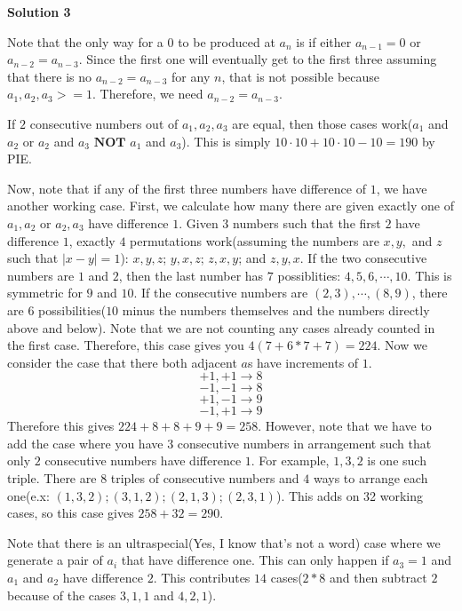 \begin{enumerate}
 



\textbf{Solution 3}

Note that the only way for a $0$ to be produced at $a_n$ is if either $a_{n-1} = 0$ or $a_{n-2} = a_{n-3}$. Since the first one will eventually get to the first three assuming that there is no $a_{n-2} = a_{n-3}$ for any $n$, that is not possible because $a_1 , a_2 , a_3 >= 1$. Therefore, we need $a_{n - 2} = a_{n - 3}$. 

 If $2$ consecutive numbers out of $a_1 , a_2 , a_3$ are equal, then those cases work($a_1$ and $a_2$ or $a_2$ and $a_3$ $\textbf{NOT}$ $a_1$ and $a_3$). This is simply $10 \cdot 10 + 10 \cdot 10 - 10 = 190$ by PIE. 

 Now, note that if any of the first three numbers have difference of $1$, we have another working case. First, we calculate how many there are given exactly one of $a_1,a_2$ or $a_2,a_3$ have difference $1$. Given $3$ numbers such that the first $2$ have difference $1$, exactly $4$ permutations work(assuming the numbers are $x,y,$ and $z$ such that $|x-y| = 1$): $x,y,z$; $y,x,z$; $z,x,y$; and $z,y,x$. If the two consecutive numbers are $1$ and $2$, then the last number has $7$ possiblities: $4,5,6,\cdots , 10$. This is symmetric for $9$ and $10$. If the consecutive numbers are $(2,3),\cdots , (8,9)$, there are $6$ possibilities($10$ minus the numbers themselves and the numbers directly above and below). Note that we are not counting any cases already counted in the first case. Therefore, this case gives you $4(7 + 6 * 7 + 7) = 224$. Now we consider the case that there both adjacent $a$s have increments of $1$. 
 \[+1 , +1 \rightarrow 8\] 
 \[-1 , -1 \rightarrow 8\] 
 \[+1 , -1 \rightarrow 9\] 
 \[-1 , +1 \rightarrow 9\] Therefore this gives $224 + 8 + 8 + 9 + 9 = 258$. However, note that we have to add the case where you have $3$ consecutive numbers in arrangement such that only $2$ consecutive numbers have difference $1$. For example, $1,3,2$ is one such triple. There are $8$ triples of consecutive numbers and $4$ ways to arrange each one(e.x: $(1,3,2);(3,1,2);(2,1,3);(2,3,1)$). This adds on 32 working cases, so this case gives $258 + 32 = 290$.

 Note that there is an ultraspecial(Yes, I know that's not a word) case where we generate a pair of $a_i$ that have difference one. This can only happen if $a_3 = 1$ and $a_1$ and $a_2$ have difference $2$. This contributes $14$ cases($2 * 8$ and then subtract $2$ because of the cases $3,1,1$ and $4,2,1$).


\end{enumerate}
